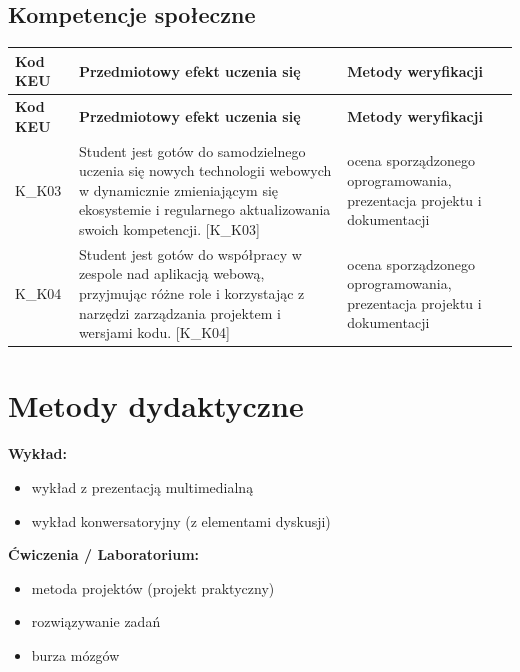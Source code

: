 \documentclass[12pt, a4paper]{article}
\newcommand{\thdrule}{\noalign{\global\setlength{\extrarowheight}{0pt}}}
\newcommand{\thdend}{\noalign{\global\setlength{\extrarowheight}{3pt}}}
\begin{document}
\subsection*{Kompetencje społeczne}
{\scriptsize
\begin{longtable}{m{1.6cm}m{9.0cm}m{4.2cm}}
\thdrule\toprule
\rowcolor{pjatkRed} {\color{white}\footnotesize\textbf{\vphantom{Ag}Kod KEU}} & {\color{white}\footnotesize\textbf{\vphantom{Ag}Przedmiotowy efekt uczenia się}} & {\color{white}\footnotesize\textbf{\vphantom{Ag}Metody weryfikacji}} \\
\midrule\thdend
\endfirsthead
\thdrule\toprule
\rowcolor{pjatkRed} {\color{white}\footnotesize\textbf{\vphantom{Ag}Kod KEU}} & {\color{white}\footnotesize\textbf{\vphantom{Ag}Przedmiotowy efekt uczenia się}} & {\color{white}\footnotesize\textbf{\vphantom{Ag}Metody weryfikacji}} \\
\midrule\thdend
\endhead
  \rowcolor{tableRowLight} K\_K03 & Student jest gotów do samodzielnego uczenia się nowych technologii webowych w dynamicznie zmieniającym się ekosystemie i regularnego aktualizowania swoich kompetencji. {[}K\_K03{]} & ocena sporządzonego oprogramowania, prezentacja projektu i dokumentacji \\
  \rowcolor{tableRowAlt} K\_K04 & Student jest gotów do współpracy w zespole nad aplikacją webową, przyjmując różne role i korzystając z narzędzi zarządzania projektem i wersjami kodu. {[}K\_K04{]} & ocena sporządzonego oprogramowania, prezentacja projektu i dokumentacji \\
\bottomrule
\end{longtable}}

\section{Metody dydaktyczne}

\textbf{Wykład:}
\begin{itemize}
  \item wykład z prezentacją multimedialną
  \item wykład konwersatoryjny (z elementami dyskusji)
\end{itemize}
\vspace{4pt}
\textbf{Ćwiczenia / Laboratorium:}
\begin{itemize}
  \item metoda projektów (projekt praktyczny)
  \item rozwiązywanie zadań
  \item burza mózgów
\end{itemize}
\vspace{4pt}
\end{document}
